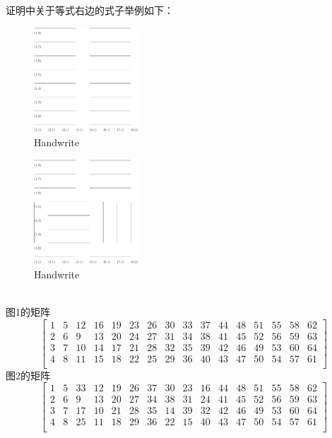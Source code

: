 \documentclass[twoside,a4paper,CCT]{cctart}   %
\begin{document}
证明中关于等式右边的式子举例如下：
\begin{figure}[htbp]
  \centering
  \includegraphics[width=0.35\textwidth]{c.pdf}
  \caption{Handwrite}\label{fig:digit}
\end{figure}
\begin{figure}[htbp]
  \centering
  \includegraphics[width=0.35\textwidth]{d.pdf}
  \caption{Handwrite}\label{fig:digit}
\end{figure}\\
图1的矩阵
$$\begin{bmatrix}
1&5&12&16&19&23&26&30&33&37&44&48&51&55&58&62\\
2&6&9&13&20&24&27&31&34&38&41&45&52&56&59&63\\
3&7&10&14&17&21&28&32&35&39&42&46&49&53&60&64\\
4&8&11&15&18&22&25&29&36&40&43&47&50&54&57&61\\\end{bmatrix}$$
图2的矩阵
$$\begin{bmatrix}
1&5&33&12&19&26&37&30&23&16&44&48&51&55&58&62\\
2&6&9&13&20&27&34&38&31&24&41&45&52&56&59&63\\
3&7&17&10&21&28&35&14&39&32&42&46&49&53&60&64\\
4&8&25&11&18&29&36&22&15&40&43&47&50&54&57&61\\\end{bmatrix}$$
\end{document}
